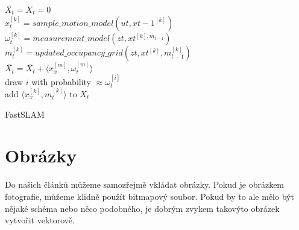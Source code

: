 \documentclass[a4paper, 11pt]{article}
\begin{document}
\begin{algorithm}[H]
    \label{algoritmus}
    \SetNlSty{}{}{:}
    \SetInd{1em}{1em}
    \BlankLine
    $ \overline{X_t} = X_t = 0 $ \\
    { 
    $x_t^{[k]} = sample\_motion\_model(ut,x{t-1}^{[k]})$ \\
    $\omega_t^{[k]} = measurement\_model(zt,x{t}^{[k],m_{t-1}})$ \\
    $m_t^{[k]} =updated\_occupancy\_grid(zt,x{t}^{[k]},m_{t-1}^{[k]})$ \\
    $\overline{X_t} = \overline{X_t} + \langle x_x^{[m]}, \omega_t^{[m]} \rangle$ \\
    }
    {
        draw $i$ with probability $ \approx\omega_t^{[i]}$ \\
        add $\langle x_x^{[k]}, m_t^{[k]} \rangle\textrm{ to }X_t$ \\
    }
    \caption{FastSLAM}
\end{algorithm}
\hspace{4em}


\section{Obrázky}

Do našich článků můžeme samozřejmě vkládat obrázky. Pokud je obrázkem fotografie, můžeme klidně
použít bitmapový soubor. Pokud by to ale mělo být nějaké schéma nebo něco podobného, je dobrým
zvykem takovýto obrázek vytvořit vektorově.
\end{document}
